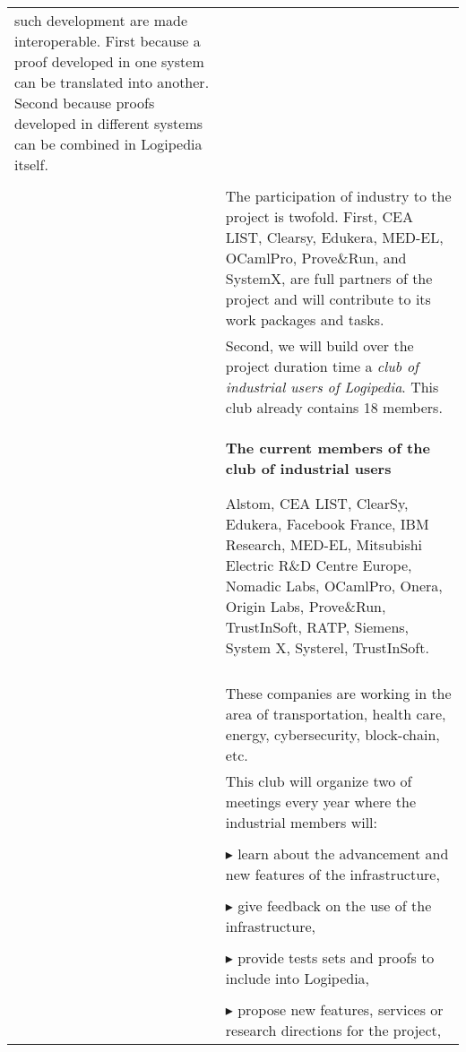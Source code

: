 \begin{longtable}{|p{}|p{}|}
  such development are made interoperable. First because a proof
  developed in one system can be translated into another. Second
  because proofs developed in different systems can be combined in
  Logipedia itself.\\
&\\
&
\hspace{0.4cm}
The participation of industry to the project is twofold.  First, CEA
LIST, Clearsy, Edukera, MED-EL, OCamlPro, Prove\&Run, and SystemX, are
full partners of the project and will contribute to its work packages
and tasks.
\\
&
\hspace{0.4cm}
Second, we will build over the project duration time a {\em club of
  industrial users of Logipedia}. This club already contains
18 members.
\\
&
\hspace{0.4cm}
\begin{framed}
\begin{center}
  {\bf \Large The current members of the club of industrial users}
\end{center}
Alstom, 
CEA LIST, 
ClearSy, 
Edukera, 
Facebook France, 
IBM Research, 
MED-EL, 
Mitsubishi Electric R\&D Centre Europe,
Nomadic Labs,
OCamlPro, 
Onera, 
Origin Labs, 
Prove\&Run, 
TrustInSoft, 
RATP, 
Siemens, 
System X, 
Systerel, 
TrustInSoft.
\end{framed}\\
&\\
&
\hspace{0.4cm}
These companies are working in the area of transportation, health
care, energy, cybersecurity, block-chain, etc.
\\
&
\hspace{0.4cm}
This club will organize two of meetings every year where the
industrial members will:\\
&\\
&
$\blacktriangleright$ 
learn about the advancement and new features of the infrastructure,\\
&\\
&
$\blacktriangleright$ 
give feedback on the use of the infrastructure,
\\
&\\
&
$\blacktriangleright$ provide tests sets and proofs to include into Logipedia,
\\
&\\
&
$\blacktriangleright$ propose new features, services or research directions for the project,
\\

\end{longtable}
